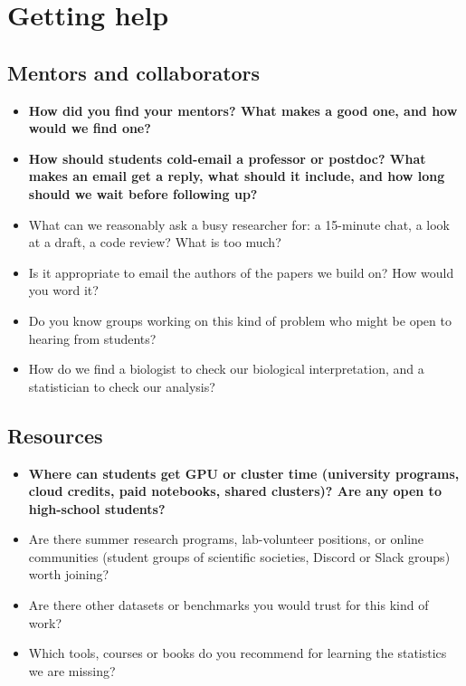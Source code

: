 \documentclass[10.5pt]{article}
\newcommand{\Q}[1]{\item[$\square$] #1}
\newcommand{\QS}[1]{\item[\textbf{$\star$}] \textbf{#1}}
\begin{document}
\section{Getting help}
\subsection*{Mentors and collaborators}
\begin{itemize}
\QS{How did you find your mentors? What makes a good one, and how would we find one?}
\QS{How should students cold-email a professor or postdoc? What makes an email get a reply, what should it include, and how long should we wait before following up?}
\Q{What can we reasonably ask a busy researcher for: a 15-minute chat, a look at a draft, a code review? What is too much?}
\Q{Is it appropriate to email the authors of the papers we build on? How would you word it?}
\Q{Do you know groups working on this kind of problem who might be open to hearing from students?}
\Q{How do we find a biologist to check our biological interpretation, and a statistician to check our analysis?}
\end{itemize}

\subsection*{Resources}
\begin{itemize}
\QS{Where can students get GPU or cluster time (university programs, cloud credits, paid notebooks, shared clusters)? Are any open to high-school students?}
\Q{Are there summer research programs, lab-volunteer positions, or online communities (student groups of scientific societies, Discord or Slack groups) worth joining?}
\Q{Are there other datasets or benchmarks you would trust for this kind of work?}
\Q{Which tools, courses or books do you recommend for learning the statistics we are missing?}
\end{itemize}

\end{document}
